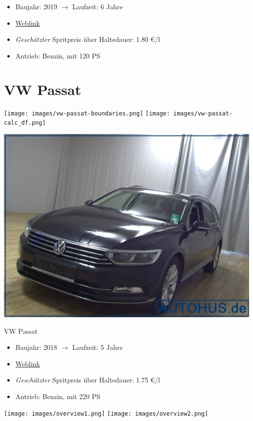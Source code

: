 \documentclass[landscape, DIV=99, 14pt]{scrartcl}
\begin{document}
\begin{itemize}
    \item Baujahr: 2019 $\rightarrow$ Laufzeit: 6 Jahre
    \item \href{https://suchen.mobile.de/fahrzeuge/details.html?id=333199596}{Weblink}
    \item \emph{Gesch\"atzter} Spritpreis \"uber Haltedauer: 1.80 \euro{}/l
    \item Antrieb: Benzin, mit 120 PS
\end{itemize}

\pagebreak


\twocolumn

\section*{VW Passat}
\begin{center}
\texttt{[image: images/vw-passat-boundaries.png]}
\null
\vspace{0.5cm}
\texttt{[image: images/vw-passat-calc\_df.png]}
\end{center}

\pagebreak
\null
\vspace{2cm}
\begin{center}
\includegraphics[width=0.9\columnwidth]{cars/vw-passat.png}

VW Passat
\end{center}

\begin{itemize}
    \item Baujahr: 2018 $\rightarrow$ Laufzeit: 5 Jahre
    \item \href{https://www.autohus.de/autosuche/details/260323/vw-passat-var-2-0-tsi/}{Weblink}
    \item \emph{Gesch\"atzter} Spritpreis \"uber Haltedauer: 1.75 \euro{}/l
    \item Antrieb: Benzin, mit 220 PS
\end{itemize}

\pagebreak



\pagebreak

\onecolumn
\null
\vfill 
\begin{center}
\texttt{[image: images/overview1.png]}
\null
\vspace{0.5cm}
\texttt{[image: images/overview2.png]}
\end{center}
\vfill 
\end{document}
